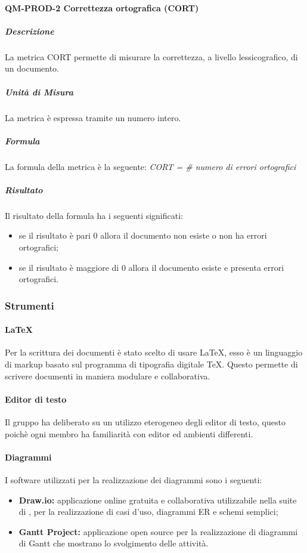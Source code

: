 			\paragraph{QM-PROD-2 Correttezza ortografica (CORT)}
				\subparagraph{Descrizione}
					La metrica CORT permette di misurare la correttezza, a livello lessicografico, di un documento.
				\subparagraph{Unità di Misura}
					La metrica è espressa tramite un numero intero.
				\subparagraph{Formula}
					La formula della metrica è la seguente:
					\textit{CORT = \# numero di errori ortografici}
				\subparagraph{Risultato}
					Il risultato della formula ha i seguenti significati:
					\begin{itemize}
						\item se il risultato è pari 0 allora il documento non esiste o non ha errori ortografici;
						\item se il risultato è maggiore di 0 allora il documento esiste e presenta errori ortografici.
					\end{itemize}

		\subsubsection{Strumenti}
			\paragraph{LaTeX}
				Per la scrittura dei documenti è stato scelto di usare \LaTeX{}, esso è un linguaggio di markup basato sul programma di tipografia digitale \TeX{}. Questo permette di scrivere documenti in maniera modulare e collaborativa.
			\paragraph{Editor di testo}
				Il gruppo ha deliberato su un utilizzo eterogeneo degli editor di testo, questo poichè ogni membro ha familiarità con editor ed ambienti differenti.
			\paragraph{Diagrammi}
				I software utilizzati per la realizzazione dei diagrammi sono i seguenti:
				\begin{itemize}
					\item \textbf{Draw.io:} applicazione online gratuita e collaborativa utilizzabile nella suite di , per la realizzazione di casi d'uso, diagrammi ER e schemi semplici;
					\item \textbf{Gantt Project:} applicazione open source per la realizzazione di diagrammi di Gantt che mostrano lo svolgimento delle attività.
				\end{itemize}
